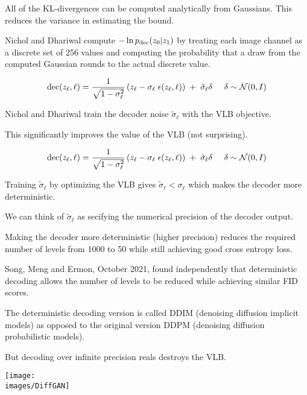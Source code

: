 {All of the KL-divergences can be computed analytically from Gaussians.  This reduces the variance in estimating the bound.

\vfill
Nichol and Dhariwal compute $- \ln p_{\mathrm{dec}}(z_0|z_1)$ by treating each image channel as a discrete set of 256 values and computing the probability that a draw from
the computed Gaussian rounds to the actual discrete value.


$$\mathrm{dec}(z_\ell,\ell) = \frac{1}{\sqrt{1-\sigma_\ell^2}}\left(z_\ell - \sigma_\ell\; \epsilon(z_\ell,\ell)\right)\; +\; \tilde{\sigma}_\ell\delta\;\;\;\;\;\delta \sim {\cal N}(0,I)$$

\vfill
Nichol and Dhariwal train the decoder noise $\tilde{\sigma}_\ell$ with the VLB objective.

\vfill
This significantly improves the value of the VLB (not surprising).


$$\mathrm{dec}(z_\ell,\ell) = \frac{1}{\sqrt{1-\sigma_\ell^2}}\left(z_\ell - \sigma_\ell\; \epsilon(z_\ell,\ell)\right)\; +\; \tilde{\sigma}_\ell\delta\;\;\;\;\;\delta \sim {\cal N}(0,I)$$

\vfill
Training $\tilde{\sigma}_\ell$ by optimizing the VLB gives $\tilde{\sigma}_\ell < \sigma_\ell$ which makes the decoder more deterministic.

\vfill
We can think of $\tilde{\sigma}_\ell$ as secifying the numerical precision of the decoder output.

\vfill
Making the decoder more deterministic (higher precision) reduces the required number of levels from 1000 to 50 while still achieving good cross entropy loss.


Song, Meng and Ermon, October 2021, found independently that deterministic decoding allows the number of levels to be reduced while achieving similar FID scores.

\vfill
The deterministic decoding version is called DDIM (denoising diffusion implicit models) as opposed to the original version DDPM
(denoising diffusion probabilistic models).

\vfill
But decoding over infinite precision reals destroys the VLB.


\centerline{\texttt{[image: \\images/DiffGAN]}}

}
